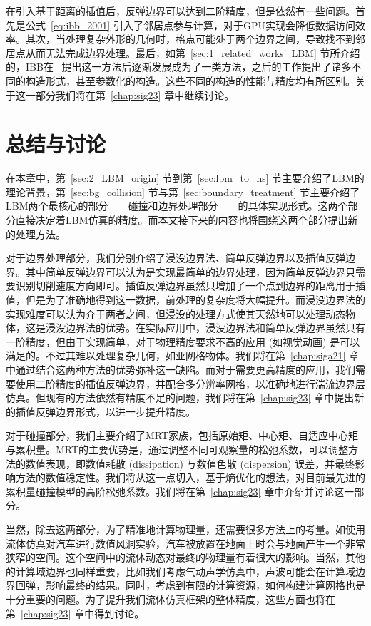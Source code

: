 在引入基于距离的插值后，反弹边界可以达到二阶精度，但是依然有一些问题。首先是公式~\ref{eq:ibb_2001} 引入了邻居点参与计算，对于GPU实现会降低数据访问效率。其次，当处理复杂外形的几何时，格点可能处于两个边界之间，导致找不到邻居点从而无法完成边界处理。最后，如第~\ref{sec:1_related_works_LBM} 节所介绍的，IBB在~\citet{Bouzidi-2001} 提出这一方法后逐渐发展成为了一类方法，之后的工作提出了诸多不同的构造形式，甚至参数化的构造。这些不同的构造的性能与精度均有所区别。关于这一部分我们将在第~\ref{chap:sig23} 章中继续讨论。

\section{总结与讨论}
在本章中，第~\ref{sec:2_LBM_origin} 节到第~\ref{sec:lbm_to_ns} 节主要介绍了LBM的理论背景，第~\ref{sec:bg_collision} 节与第~\ref{sec:boundary_treatment} 节主要介绍了LBM两个最核心的部分——碰撞和边界处理部分——的具体实现形式。这两个部分直接决定着LBM仿真的精度。而本文接下来的内容也将围绕这两个部分提出新的处理方法。

对于边界处理部分，我们分别介绍了浸没边界法、简单反弹边界以及插值反弹边界。其中简单反弹边界可以认为是实现最简单的边界处理，因为简单反弹边界只需要识别切削速度方向即可。插值反弹边界虽然只增加了一个点到边界的距离用于插值，但是为了准确地得到这一数据，前处理的复杂度将大幅提升。而浸没边界法的实现难度可以认为介于两者之间，但浸没的处理方式使其天然地可以处理动态物体，这是浸没边界法的优势。在实际应用中，浸没边界法和简单反弹边界虽然只有一阶精度，但由于实现简单，对于物理精度要求不高的应用 (如视觉动画) 是可以满足的。不过其难以处理复杂几何，如亚网格物体。我们将在第~\ref{chap:siga21} 章中通过结合这两种方法的优势弥补这一缺陷。而对于需要更高精度的应用，我们需要使用二阶精度的插值反弹边界，并配合多分辨率网格，以准确地进行湍流边界层仿真。但现有的方法依然有精度不足的问题，我们将在第~\ref{chap:sig23} 章中提出新的插值反弹边界形式，以进一步提升精度。

对于碰撞部分，我们主要介绍了MRT家族，包括原始矩、中心矩、自适应中心矩与累积量。MRT的主要优势是，通过调整不同可观察量的松弛系数，可以调整方法的数值表现，即数值耗散 (dissipation) 与数值色散 (dispersion) 误差，并最终影响方法的数值稳定性。我们将从这一点切入，基于熵优化的想法，对目前最先进的累积量碰撞模型的高阶松弛系数。我们将在第~\ref{chap:sig23} 章中介绍并讨论这一部分。

当然，除去这两部分，为了精准地计算物理量，还需要很多方法上的考量。如使用流体仿真对汽车进行数值风洞实验，汽车被放置在地面上时会与地面产生一个非常狭窄的空间。这个空间中的流体动态对最终的物理量有着很大的影响。当然，其他的计算域边界也同样重要，比如我们考虑气动声学仿真中，声波可能会在计算域边界回弹，影响最终的结果。同时，考虑到有限的计算资源，如何构建计算网格也是十分重要的问题。为了提升我们流体仿真框架的整体精度，这些方面也将在第~\ref{chap:sig23} 章中得到讨论。